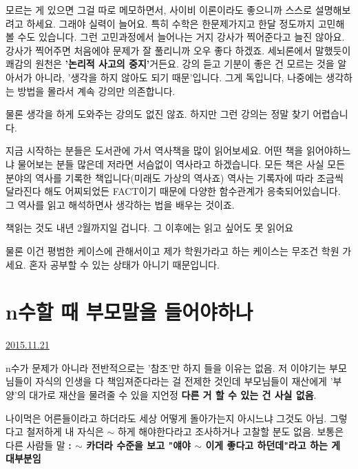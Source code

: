 모르는 게 있으면 그걸 따로 메모하면서, 사이비 이론이라도 좋으니까 스스로 설명해보려고 하세요. 그래야 실력이 늘어요.
특히 수학은 한문제가지고 한달 정도까지 고민해 볼 수도 있습니다. 그런 고민과정에서 늘어나는 거지 강사가 찍어준다고 늘진 않아요.
강사가 찍어주면 처음에야 문제가 잘 풀리니까 오우 좋다 하겠죠. 세뇌론에서 말했듯이 쾌감의 원천은 \textbf{'논리적 사고의 중지'}거든요.
강의 듣고 기분이 좋은 건 모르는 것을 알아서가 아니라, '생각을 하지 않아도 되기 때문'입니다.
그게 독입니다, 나중에는 생각하는 방법을 몰라서 계속  강의만 의존합니다.
\vspace{5mm}

물론 생각을 하게 도와주는 강의도 없진 않죠. 하지만 그런 강의는 정말 찾기 어렵습니다.
\vspace{5mm}

지금 시작하는 분들은 도서관에 가서 역사책을 많이 읽어보세요.
어떤 책을 읽어야하느냐 물어보는 분들 많은데 저라면 서슴없이 역사라고 하겠습니다.
모든 책은 사실 모든 분야의 역사를 기록한 책입니다(미래도 가상의 역사죠)
역사는 기록자에 따라 조금씩 달라진다 해도 어찌되었든 FACT이기 때문에 다양한 함수관계가 응축되어있습니다.
그 역사를 읽고 해석하면사 생각하는 법을 배우는 것이죠.
\vspace{5mm}

책읽는 것도 내년 2월까지일 겁니다. 그 이후에는 읽고 싶어도 못 읽어요
\vspace{5mm}

물론 이건 평범한 케이스에 관해서이고
제가 학원가라고 하는 케이스는 무조건 학원 가세요.
혼자 공부할 수 있는 상태가 아니기 때문입니다.
\vspace{5mm}






\section{n수할 때 부모말을 들어야하나}
\href{https://www.kockoc.com/Apoc/503343}{2015.11.21}

\vspace{5mm}

n수가 문제가 아니라 전반적으로는 '참조'만 하지 들을 이유는 없음.
저 이야기는 부모님들이 자식의 인생을 다 책임져준다라는 걸 전제한 것인데
부모님들이 재산에게 '부양'의 대가로 재산을 물려줄 수 있을 지언정 \textbf{다른 거 할 수 있는 건 사실 없음}.
\vspace{5mm}

나이먹은 어른들이라고 하더라도 세상 어떻게 돌아가는지 아시느냐 그것도 아님.
그렇다고 철저하게 내 자식은 $\sim$ 하게 해야한다라고 조사하거나 고찰할 분도 없음.
보통은 다른 사람들 말 \textbf{: $\sim$ 카더라 수준을 보고 "얘야 $\sim$ 이게 좋다고 하던데"라고 하는 게 대부분임}
\vspace{5mm}

